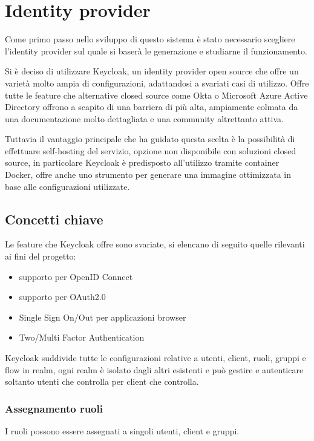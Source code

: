 \section{Identity provider}

Come primo passo nello sviluppo di questo sistema è stato necessario scegliere l'identity provider sul quale si baserà le generazione e studiarne il funzionamento.

Si è deciso di utilizzare Keycloak, un identity provider open source che offre un varietà molto ampia di configurazioni, adattandosi a svariati casi di utilizzo. Offre tutte le feature che alternative closed source come Okta o Microsoft Azure Active Directory offrono a scapito di una barriera di più alta, ampiamente colmata da una documentazione molto dettagliata e una community altrettanto attiva.

Tuttavia il vantaggio principale che ha guidato questa scelta è la possibilità di effettuare self-hosting del servizio, opzione non disponibile con soluzioni closed source, in particolare Keycloak è predisposto all'utilizzo tramite container Docker, offre anche uno strumento per generare una immagine ottimizzata in base alle configurazioni utilizzate.

\subsection{Concetti chiave}

Le feature che Keycloak offre sono svariate, si elencano di seguito quelle rilevanti ai fini del progetto:
\begin{itemize}
    \item supporto per OpenID Connect
    \item supporto per OAuth2.0
    \item Single Sign On/Out per applicazioni browser
    \item Two/Multi Factor Authentication
\end{itemize}

Keycloak suddivide tutte le configurazioni relative a utenti, client, ruoli, gruppi e flow in realm, ogni realm è isolato dagli altri esistenti e può gestire e autenticare soltanto utenti che controlla per client che controlla.

\subsubsection{Assegnamento ruoli}

I ruoli possono essere assegnati a singoli utenti, client e gruppi.

